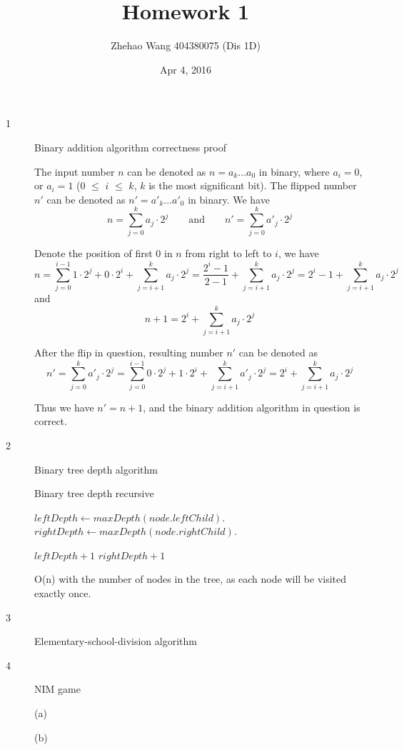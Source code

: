 \documentclass{article}
\title{Homework 1}
\author{Zhehao Wang 404380075 (Dis 1D)}
\date{Apr 4, 2016}
\begin{document}
\maketitle

\begin{description}

\item[1]{Binary addition algorithm correctness proof}
  
  The input number $n$ can be denoted as $n=a_k...a_0$ in binary, where $a_i=0$, or $a_i=1$ ($0$ $\leq$ $i$ $\leq$ $k$, $k$ is the most significant bit). The flipped number $n'$ can be denoted as  $n'=a'_k...a'_0$ in binary.
  We have 
  \[
  n = \sum_{j=0}^{k}{a_j \cdot 2^j}
  \qquad \text{and} \qquad 
  n' = \sum_{j=0}^{k}{a'_j \cdot 2^j}
  \]
  
  Denote the position of first $0$ in $n$ from right to left to $i$, we have 
  $$n = \sum_{j=0}^{i-1}{1 \cdot 2^j} + 0 \cdot 2^i + \sum_{j=i+1}^{k}{a_j \cdot 2^j} = \frac{2^i-1}{2-1} + \sum_{j=i+1}^{k}{a_j \cdot 2^j} = 2^i - 1 + \sum_{j=i+1}^{k}{a_j \cdot 2^j}$$ 
  and
  $$n + 1 = 2^i + \sum_{j=i+1}^{k}{a_j \cdot 2^j}$$

  After the flip in question, resulting number $n'$ can be denoted as
  $$n' = \sum_{j=0}^{k}{a'_j \cdot 2^j} = \sum_{j=0}^{i-1}{0 \cdot 2^j} + 1 \cdot 2^i + \sum_{j=i+1}^{k}{a'_j \cdot 2^j} = 2^i + \sum_{j=i+1}^{k}{a_j \cdot 2^j}$$

  Thus we have $n' = n + 1$, and the binary addition algorithm in question is correct.

\item[2]{Binary tree depth algorithm}

  \begin{algorithm}
  \caption{Binary tree depth recursive}
    \begin{algorithmic}[1]
      \EndIf

      \State $leftDepth \gets maxDepth(node.leftChild)$.
      \State $rightDepth \gets maxDepth(node.rightChild)$.

        \Return $leftDepth + 1$
      \Else {} 
        \Return $rightDepth + 1$
      \EndIf
    \EndFunction
    \end{algorithmic}
  \end{algorithm}

  O(n) with the number of nodes in the tree, as each node will be visited exactly once.

\item[3]{Elementary-school-division algorithm}

\item[4]{NIM game}

(a)

(b)

\end{description}
\end{document}
